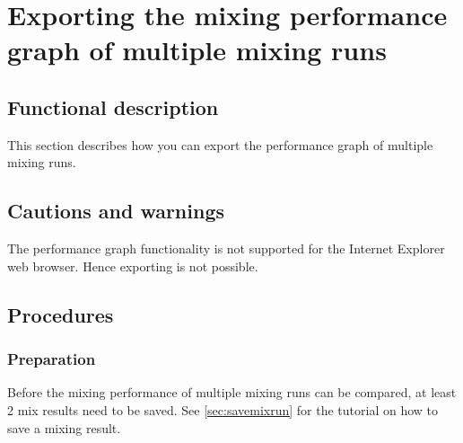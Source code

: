 
\section{Exporting the mixing performance graph of multiple mixing runs}
\label{sec:exportMultiGraph}

\subsection{Functional description}
This section describes how you can export the performance graph of multiple mixing runs.

\subsection{Cautions and warnings}
The performance graph functionality is not supported for the Internet Explorer web browser. Hence exporting is not possible.

\subsection{Procedures}
\subsubsection{Preparation}
Before the mixing performance of multiple mixing runs can be compared, at least 2 mix results need to be saved. See \ref{sec:savemixrun} for the tutorial on how to save a mixing result.

